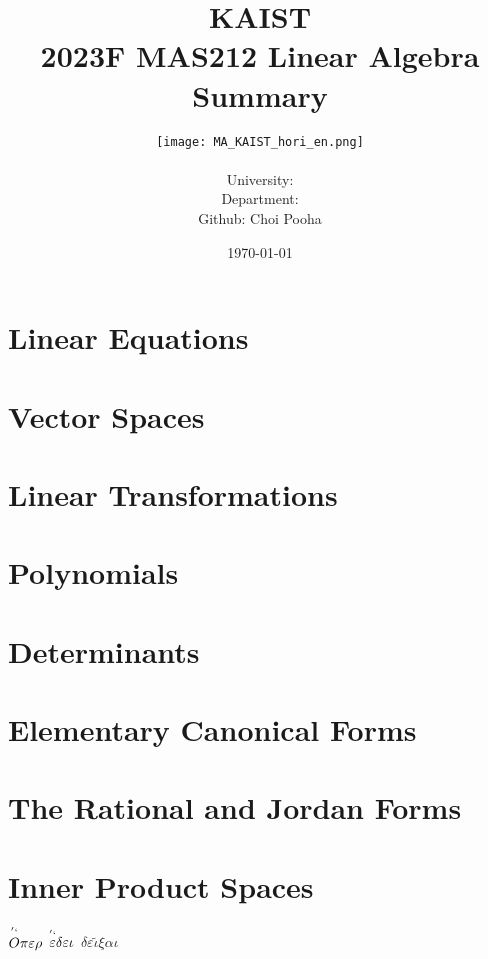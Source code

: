 \documentclass[a4paper,12pt]{report}
\title{KAIST\\2023F MAS212 Linear Algebra\\
Summary\bigskip}
\author{\texttt{[image: MA\_KAIST\_hori\_en.png]}\\\textbf{\Large \name} \\
University: \university\\
Department: \department\\
Github: Choi Pooha}
\date{\today}
\begin{document}
\maketitle
\newpage
{}
\tikzexternaldisable
\tableofcontents
\tikzexternalenable
\pagebreak

\chapter{Linear Equations}

\chapter{Vector Spaces}
 
\chapter{Linear Transformations}

\chapter{Polynomials}

\chapter{Determinants}

\chapter{Elementary Canonical Forms}

\chapter{The Rational and Jordan Forms}

\chapter{Inner Product Spaces}

\vfill
\begin{center}
    \textit{\textbf{$\overset{'`}{O}\pi\varepsilon\rho$ $\overset{'`}{\varepsilon}\delta\varepsilon\iota$ $\delta\varepsilon\tilde{\iota}\xi\alpha\iota$}}
\end{center}
\end{document}
